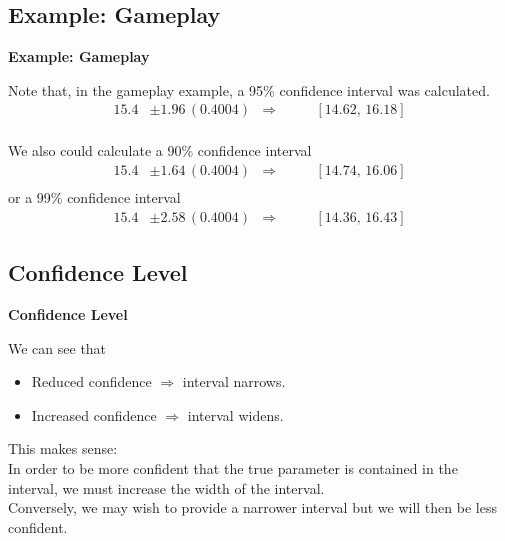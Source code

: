 \documentclass[compress]{beamer}        %
\makeatletter
\newcommand{\tcb}{\textcolor{beamer@blendedblue}}
\makeatother
\begin{document}
\subsection{Example: Gameplay}
\begin{frame}{\bf \tcb{Example: Gameplay}}

Note that, in the gameplay example, a 95\% confidence interval was calculated.
\begin{align*}
15.4  &\pm 1.96\,(0.4004) & \Rightarrow & \qquad [14.62,\,16.18]\\
\end{align*}

We also could calculate a 90\% confidence interval
\begin{align*}
15.4  &\pm 1.64\,(0.4004) & \Rightarrow & \qquad [14.74,\,16.06]\\
\end{align*}
or a 99\% confidence interval
\begin{align*}
15.4  &\pm 2.58\,(0.4004) & \Rightarrow & \qquad [14.36,\,16.43]
\end{align*}

\end{frame}




\subsection{Confidence Level}
\begin{frame}{\bf \tcb{Confidence Level}}

We can see that\\[0.2cm]
\begin{itemize}\itemsep0.4cm
\item Reduced confidence $\Rightarrow$ interval narrows.
\item Increased confidence $\Rightarrow$ interval widens.\\[0.9cm]
\end{itemize}

This makes sense:\\[0.4cm]

In order to be more confident that the true parameter is contained in the interval, we must increase the width of the interval.\\[0.4cm]

Conversely, we may wish to provide a narrower interval but we will then be less confident.

\end{frame}
\end{document}
